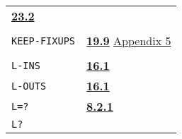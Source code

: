 \documentclass[a4paper,]{article}
\begin{document}
\begin{longtable}[]{@{}ll@{}}
\begin{minipage}[t]{0.70\columnwidth}
\textbf{\href{23-mdl-as-a-system-process.md\#232-names}{23.2}}\strut
\end{minipage}\tabularnewline
\begin{minipage}[t]{0.24\columnwidth}\raggedright\strut
\strut
\end{minipage} & \begin{minipage}[t]{0.70\columnwidth}\raggedright\strut
\strut
\end{minipage}\tabularnewline
\begin{minipage}[t]{0.24\columnwidth}\raggedright\strut
\texttt{KEEP-FIXUPS}\strut
\end{minipage} & \begin{minipage}[t]{0.70\columnwidth}\raggedright\strut
\textbf{\href{19-compiled-programs.md\#199-fixups}{19.9}}
\href{appendix-5-initial-settings.md\#appendix-5-initial-settings}{Appendix 5}\strut
\end{minipage}\tabularnewline
\begin{minipage}[t]{0.24\columnwidth}\raggedright\strut
\strut
\end{minipage} & \begin{minipage}[t]{0.70\columnwidth}\raggedright\strut
\strut
\end{minipage}\tabularnewline
\begin{minipage}[t]{0.24\columnwidth}\raggedright\strut
\texttt{L-INS}\strut
\end{minipage} & \begin{minipage}[t]{0.70\columnwidth}\raggedright\strut
\textbf{\href{16-errors-frames-etc.md\#161-listen}{16.1}}\strut
\end{minipage}\tabularnewline
\begin{minipage}[t]{0.24\columnwidth}\raggedright\strut
\texttt{L-OUTS}\strut
\end{minipage} & \begin{minipage}[t]{0.70\columnwidth}\raggedright\strut
\textbf{\href{16-errors-frames-etc.md\#161-listen}{16.1}}\strut
\end{minipage}\tabularnewline
\begin{minipage}[t]{0.24\columnwidth}\raggedright\strut
\texttt{L=?}\strut
\end{minipage} & \begin{minipage}[t]{0.70\columnwidth}\raggedright\strut
\textbf{\href{08-truth.md\#821-arithmetic-1}{8.2.1}}\strut
\end{minipage}\tabularnewline
\begin{minipage}[t]{0.24\columnwidth}\raggedright\strut
\texttt{L?}\strut

\end{minipage}
\end{longtable}
\end{document}

